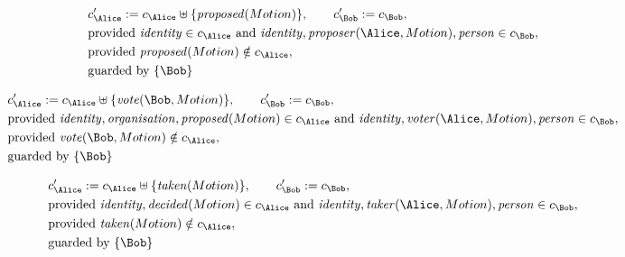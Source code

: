 \begin{align*}
&
c'_
{
\Alice
}
 := 
c_
{
\Alice
}
 \uplus 
\{
\mathit{
proposed
}
(
Motion
)
\}
, \qquad 
c'_
{
\Bob
}
 := 
c_
{
\Bob
}
,\\
&
\text{provided } 
\mathit{
identity
}
 \in c_
{
\Alice
}
 \text{ and } 
\mathit{
identity
}
,
\mathit{
proposer
}
(
\Alice
,
Motion
)
,
\mathit{
person
}
 \in c_
{
\Bob
}
,\\
&
\text{provided } 
\mathit{
proposed
}
(
Motion
)
 \notin c_
{
\Alice
}
,\\
&
\text{guarded by } \{
\Bob
\}
\end{align*}

\begin{align*}
&
c'_
{
\Alice
}
 := 
c_
{
\Alice
}
 \uplus 
\{
\mathit{
vote
}
(
\Bob
,
Motion
)
\}
, \qquad 
c'_
{
\Bob
}
 := 
c_
{
\Bob
}
,\\
&
\text{provided } 
\mathit{
identity
}
,
\mathit{
organisation
}
,
\mathit{
proposed
}
(
Motion
)
 \in c_
{
\Alice
}
 \text{ and } 
\mathit{
identity
}
,
\mathit{
voter
}
(
\Alice
,
Motion
)
,
\mathit{
person
}
 \in c_
{
\Bob
}
,\\
&
\text{provided } 
\mathit{
vote
}
(
\Bob
,
Motion
)
 \notin c_
{
\Alice
}
,\\
&
\text{guarded by } \{
\Bob
\}
\end{align*}

\begin{align*}
&
c'_
{
\Alice
}
 := 
c_
{
\Alice
}
 \uplus 
\{
\mathit{
taken
}
(
Motion
)
\}
, \qquad 
c'_
{
\Bob
}
 := 
c_
{
\Bob
}
,\\
&
\text{provided } 
\mathit{
identity
}
,
\mathit{
decided
}
(
Motion
)
 \in c_
{
\Alice
}
 \text{ and } 
\mathit{
identity
}
,
\mathit{
taker
}
(
\Alice
,
Motion
)
,
\mathit{
person
}
 \in c_
{
\Bob
}
,\\
&
\text{provided } 
\mathit{
taken
}
(
Motion
)
 \notin c_
{
\Alice
}
,\\
&
\text{guarded by } \{
\Bob
\}
\end{align*}

